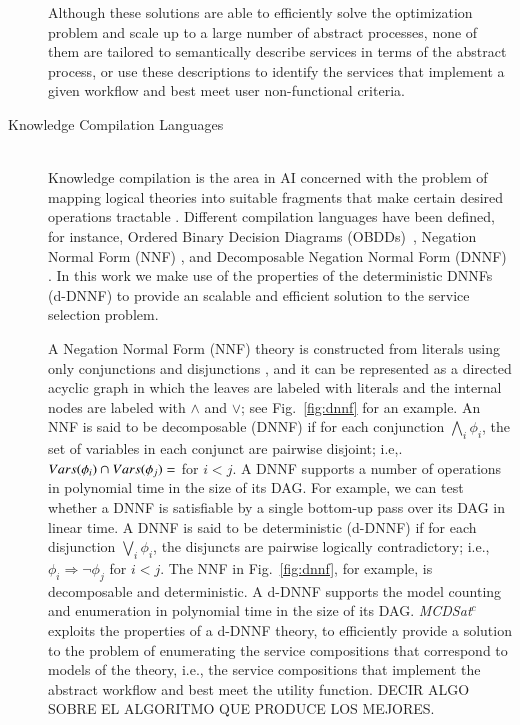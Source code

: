 \documentclass{llncs}
\begin{document}
\begin{description}
Although these solutions are able to efficiently solve the optimization problem and scale up to a large number of abstract processes, none of them are tailored to semantically describe services in terms of the abstract process, or use these descriptions to identify the services that  implement a given workflow and best meet user non-functional criteria.

  
\item[Knowledge Compilation Languages] \mbox{}\\
Knowledge compilation is the area in AI concerned with the
problem of mapping logical theories into suitable fragments
that make certain desired operations tractable
\cite{cadoli:compilation}. Different compilation languages have been defined, for instance,  
Ordered Binary Decision Diagrams (OBDDs)~\cite{bryant:obdd},  Negation Normal Form (NNF) \cite{barwise:handbook}, and Decomposable Negation Normal Form (DNNF)  \cite{darwiche:dnnf}.
In this work we make use of the properties of the deterministic DNNFs  (d-DNNF) \cite{darwiche:d-dnnfs} to provide an scalable and efficient solution to the service selection problem. 

A Negation Normal Form (NNF) theory is  constructed from literals using only conjunctions
and disjunctions \cite{barwise:handbook}, and it can be represented as a directed acyclic graph
in which the leaves are labeled with literals and the
internal nodes are labeled with $\land$ and $\lor$;
see Fig.~\ref{fig:dnnf} for an example. An NNF is said to be decomposable (DNNF) \cite{darwiche:dnnf}
if for each conjunction $\bigwedge_i\phi_i$, the set of
variables in each conjunct are pairwise disjoint;
i.e,. $Vars(\phi_i)\cap Vars(\phi_j)=\empty$ for $i<j$.
A DNNF supports a number of operations in
polynomial time in the size of its DAG. For example,
we can test whether a DNNF is satisfiable by a single
bottom-up pass over its DAG in linear time. A DNNF is said to be deterministic (d-DNNF) \cite{darwiche:d-dnnfs} if for each disjunction $\bigvee_i\phi_i$, the disjuncts
are pairwise logically contradictory; i.e.,
$\phi_i\Rightarrow\neg\phi_j$ for $i<j$.
The NNF in Fig.~\ref{fig:dnnf}, for example, is decomposable
and deterministic. A d-DNNF supports the model counting and enumeration in polynomial time
in the size of its DAG.  {\it MCDSat}$^c$  exploits the properties of a d-DNNF theory, to efficiently provide a solution to the problem of enumerating the service compositions that correspond to models of the  theory, i.e., the service compositions that implement the abstract  workflow and best meet the utility function. DECIR ALGO SOBRE EL ALGORITMO QUE PRODUCE LOS MEJORES.




\end{description}
\end{document}
